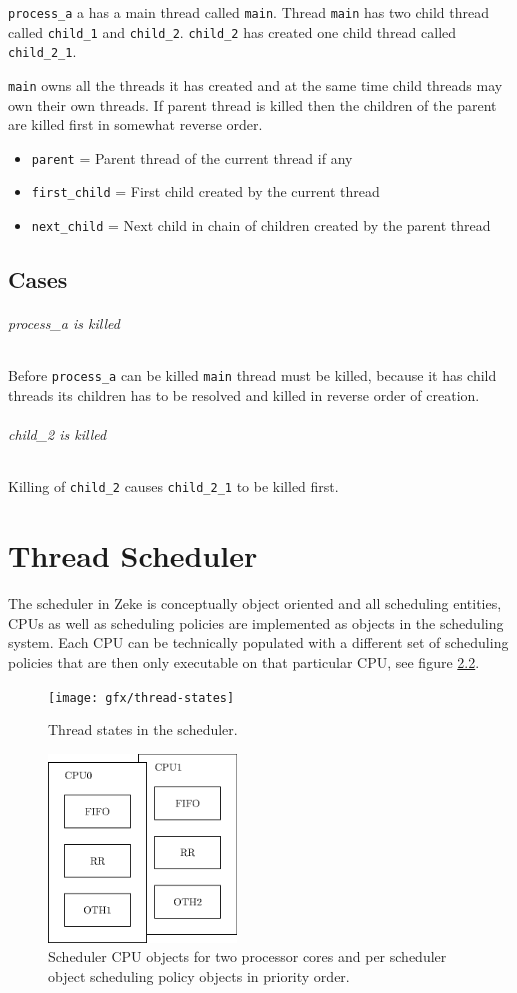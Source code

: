 \verb+process_a+ a has a main thread called \verb+main+. Thread
\verb+main+ has two child thread called \verb+child_1+ and \verb+child_2+.
\verb+child_2+ has created one child thread called \verb+child_2_1+.

\verb+main+ owns all the threads it has created and at the same time child
threads may own their own threads. If parent thread is killed then the
children of the parent are killed first in somewhat reverse order.

\begin{itemize}
  \item \verb+parent+ = Parent thread of the current thread if any
  \item \verb+first_child+ = First child created by the current thread
  \item \verb+next_child+ = Next child in chain of children created by the
        parent thread
\end{itemize}

\section{Cases}
\subparagraph*{process\_a is killed}

Before \verb+process_a+ can be killed \verb+main+ thread must be killed,
because it has child threads its children has to be resolved and killed in
reverse order of creation.

\subparagraph*{child\_2 is killed}

Killing of \verb+child_2+ causes \verb+child_2_1+ to be killed first.


\chapter{Thread Scheduler}

The scheduler in Zeke is conceptually object oriented and all
scheduling entities, CPUs as well as scheduling policies are
implemented as objects in the scheduling system. Each CPU can
be technically populated with a different set of scheduling
policies that are then only executable on that particular
CPU, see figure \ref{figure:objscheds}.

\begin{figure}
  \center
  \texttt{[image: gfx/thread-states]}
  \caption{Thread states in the scheduler.}
  \label{figure:threadstates}
\end{figure}

\begin{figure}
  \center
  \includegraphics[width=5cm]{proc/objscheds}
  \caption{Scheduler CPU objects for two processor cores and
           per scheduler object scheduling policy objects in
           priority order.}
  \label{figure:objscheds}
\end{figure}
